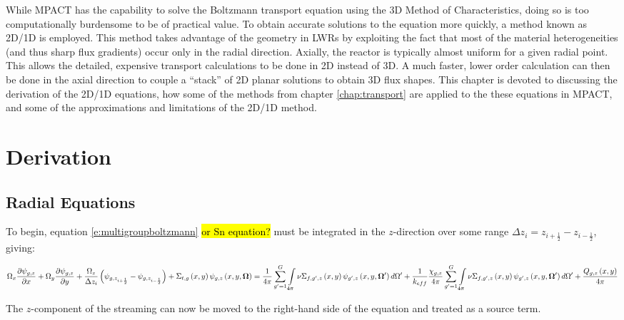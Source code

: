 While MPACT has the capability to solve the Boltzmann transport equation using the 3D Method of Characteristics, doing so is too computationally burdensome to be of practical value.  To obtain accurate solutions to the equation more quickly, a method known as 2D/1D is employed.  This method takes advantage of the geometry in LWRs by exploiting the fact that most of the material heterogeneities (and thus sharp flux gradients) occur only in the radial direction.  Axially, the reactor is typically almost uniform for a given radial point.  This allows the detailed, expensive transport calculations to be done in 2D instead of 3D.  A much faster, lower order calculation can then be done in the axial direction to couple a ``stack'' of 2D planar solutions to obtain 3D flux shapes.  This chapter is devoted to discussing the derivation of the 2D/1D equations, how some of the methods from chapter \ref{chap:transport} are applied to the these equations in MPACT, and some of the approximations and limitations of the 2D/1D method.

\section{Derivation}

\subsection{Radial Equations}

To begin, equation \ref{e:multigroupboltzmann} \hl{or Sn equation?} must be integrated in the $z$-direction over some range $\Delta z_i = z_{i+\frac{1}{2}} - z_{i-\frac{1}{2}}$, giving:

\begin{dmath}
{\Omega_x\frac{\partial \psi_{g,z}}{\partial x} + \Omega_y\frac{\partial \psi_{g,z}}{\partial y} + \frac{\Omega_z}{\Delta z_i}\left(\psi_{g,z_{i+\frac{1}{2}}} - \psi_{g,z_{i-\frac{1}{2}}}\right)} + {\Sigma_{t,g}\left(x,y\right)\psi_{g,z}\left(x,y,\bm\Omega\right)} = {\frac{1}{4\pi}\sum_{g'=1}^{G}\intop_{4\pi}\nu\Sigma_{f,g',z}\left(x,y\right)\psi_{g',z}\left(x,y,\bm\Omega'\right)d\Omega'} + {\frac{1}{k_{eff}}\frac{\chi_{g,z}}{4\pi}\sum_{g'=1}^G\intop_{4\pi} \nu\Sigma_{f,g',z}\left(x,y\right)\psi_{g',z}\left(x,y,\bm\Omega'\right)d\Omega'} + {\frac{Q_{g,z}\left(x,y\right)}{4\pi}}
\end{dmath}

The $z$-component of the streaming can now be moved to the right-hand side of the equation and treated as a source term.

